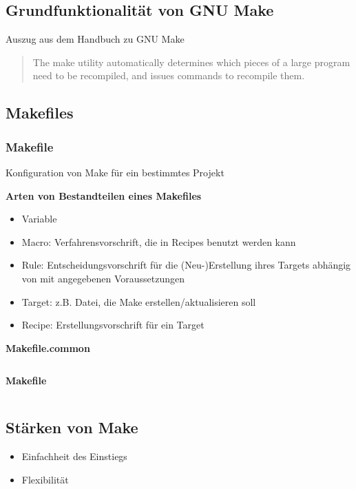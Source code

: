\subsection{Grundfunktionalität von GNU Make}
\begin{frame}
\cite{GNU_Make_manual} Auszug aus dem Handbuch zu GNU Make
\begin{quote}
The make utility automatically determines which pieces of a large program need to be recompiled, and issues commands to recompile them.
\end{quote}
\end{frame}

\subsection{Makefiles}
\begin{frame}
\frametitle{Makefile} Konfiguration von Make für ein bestimmtes Projekt

\textbf{Arten von Bestandteilen eines Makefiles}
\begin{itemize}
	\item Variable
	\item Macro: Verfahrensvorschrift, die in Recipes benutzt werden kann
	\item Rule: Entscheidungsvorschrift für die (Neu-)Erstellung ihres Targets abhängig von mit angegebenen Voraussetzungen
	\item Target: z.B. Datei, die Make erstellen/aktualisieren soll
	\item Recipe: Erstellungsvorschrift für ein Target
\end{itemize}
\end{frame}

\begin{frame}
	\setlength{\columnseprule}{.4pt}
	\begin{multicols}{2}
	\mymintedstyle
	{\tiny\textbf{Makefile.common}}
	\inputminted[linenos=true,stepnumber=5]{make}{../Makefile.common}
	\vfill\eject
	{\tiny\textbf{Makefile}}
	\inputminted[linenos=true,stepnumber=5]{make}{Makefile}
	\vfill\eject
	\end{multicols}
\end{frame}

\subsection{Stärken von Make}
\begin{frame}
	\begin{itemize}
		\item Einfachheit des Einstiegs
		\item Flexibilität
	\end{itemize}
\end{frame}

